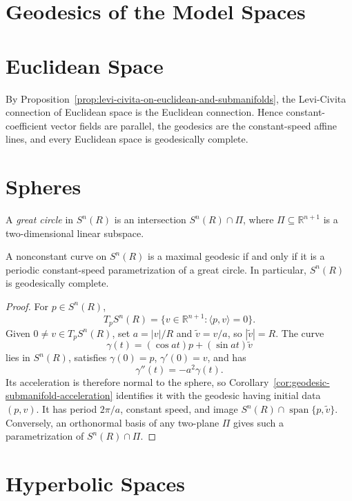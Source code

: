 \section{Geodesics of the Model Spaces}

\section{Euclidean Space}

By Proposition~\ref{prop:levi-civita-on-euclidean-and-submanifolds}, the
Levi-Civita connection of Euclidean space is the Euclidean connection. Hence
constant-coefficient vector fields are parallel, the geodesics are the
constant-speed affine lines, and every Euclidean space is geodesically complete.

\section{Spheres}

A \emph{great circle} in $S^n(R)$ is an intersection $S^n(R)\cap\Pi$, where
$\Pi\subseteq\mathbb R^{n+1}$ is a two-dimensional linear subspace.

\begin{proposition}
\label{prop:maximal-geodesic-sphere}

A nonconstant curve on $S^n(R)$ is a maximal geodesic if and only if it is a
periodic constant-speed parametrization of a great circle. In particular,
$S^n(R)$ is geodesically complete.

\begin{proof}
\sketch For $p\in S^n(R)$,
\[
T_pS^n(R)=\{v\in\mathbb R^{n+1}:\langle p,v\rangle=0\}.
\]
Given $0\ne v\in T_pS^n(R)$, set $a=|v|/R$ and
$\widetilde v=v/a$, so $|\widetilde v|=R$. The curve
\[
\gamma(t)=(\cos at)p+(\sin at)\widetilde v
\]
lies in $S^n(R)$, satisfies $\gamma(0)=p$, $\gamma'(0)=v$, and has
\[
\gamma''(t)=-a^2\gamma(t).
\]
Its acceleration is therefore normal to the sphere, so
Corollary~\ref{cor:geodesic-submanifold-acceleration} identifies it with the
geodesic having initial data $(p,v)$. It has period $2\pi/a$, constant speed,
and image $S^n(R)\cap\operatorname{span}\{p,\widetilde v\}$. Conversely, an
orthonormal basis of any two-plane $\Pi$ gives such a parametrization of
$S^n(R)\cap\Pi$.
\end{proof}
\end{proposition}

\section{Hyperbolic Spaces}

